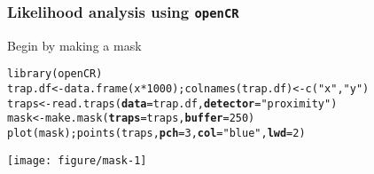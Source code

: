 \documentclass[color=usenames,dvipsnames]{beamer}\usepackage[]{graphicx}\usepackage[]{xcolor}
\makeatletter
\newcommand{\hlnum}[1]{\textcolor[rgb]{0.69,0.494,0}{#1}}%
\newcommand{\hlsng}[1]{\textcolor[rgb]{0.749,0.012,0.012}{#1}}%
\newcommand{\hlopt}[1]{\textcolor[rgb]{0,0,0}{#1}}%
\newcommand{\hldef}[1]{\textcolor[rgb]{0,0,0}{#1}}%
\newcommand{\hlkwb}[1]{\textcolor[rgb]{0,0.341,0.682}{#1}}%
\newcommand{\hlkwc}[1]{\textcolor[rgb]{0,0,0}{\textbf{#1}}}%
\newcommand{\hlkwd}[1]{\textcolor[rgb]{0.004,0.004,0.506}{#1}}%
\newenvironment{kframe}{%
 \def\at@end@of@kframe{}%
 \ifinner\ifhmode%
  \def\at@end@of@kframe{\end{minipage}}%
  \begin{minipage}{\columnwidth}%
 \fi\fi%
 \def\FrameCommand##1{\hskip\@totalleftmargin \hskip-\fboxsep
 \colorbox{shadecolor}{##1}\hskip-\fboxsep
     \hskip-\linewidth \hskip-\@totalleftmargin \hskip\columnwidth}%
 \MakeFramed {\advance\hsize-\width
   \@totalleftmargin\z@ \linewidth\hsize
   \@setminipage}}%
 {\par\unskip\endMakeFramed%
 \at@end@of@kframe}
\newenvironment{knitrout}{}{} %
\makeatother
\begin{document}
\begin{frame}[fragile]
  \frametitle{Likelihood analysis using {\tt openCR}}
Begin by making a mask
\begin{knitrout}\scriptsize
{}\color{fgcolor}\begin{kframe}
\begin{alltt}
\hlkwd{library}\hldef{(openCR)}
\hldef{trap.df} \hlkwb{<-} \hlkwd{data.frame}\hldef{(x}\hlopt{*}\hlnum{1000}\hldef{);} \hlkwd{colnames}\hldef{(trap.df)} \hlkwb{<-} \hlkwd{c}\hldef{(}\hlsng{"x"}\hldef{,}\hlsng{"y"}\hldef{)}
\hldef{traps} \hlkwb{<-} \hlkwd{read.traps}\hldef{(}\hlkwc{data}\hldef{=trap.df,} \hlkwc{detector}\hldef{=}\hlsng{"proximity"}\hldef{)}
\hldef{mask} \hlkwb{<-} \hlkwd{make.mask}\hldef{(}\hlkwc{traps}\hldef{=traps,} \hlkwc{buffer}\hldef{=}\hlnum{250}\hldef{)}
\hlkwd{plot}\hldef{(mask);} \hlkwd{points}\hldef{(traps,} \hlkwc{pch}\hldef{=}\hlnum{3}\hldef{,} \hlkwc{col}\hldef{=}\hlsng{"blue"}\hldef{,} \hlkwc{lwd}\hldef{=}\hlnum{2}\hldef{)}
\end{alltt}
\end{kframe}

{\centering \texttt{[image: figure/mask-1]} 

}


\end{knitrout}
\end{frame}
\end{document}
